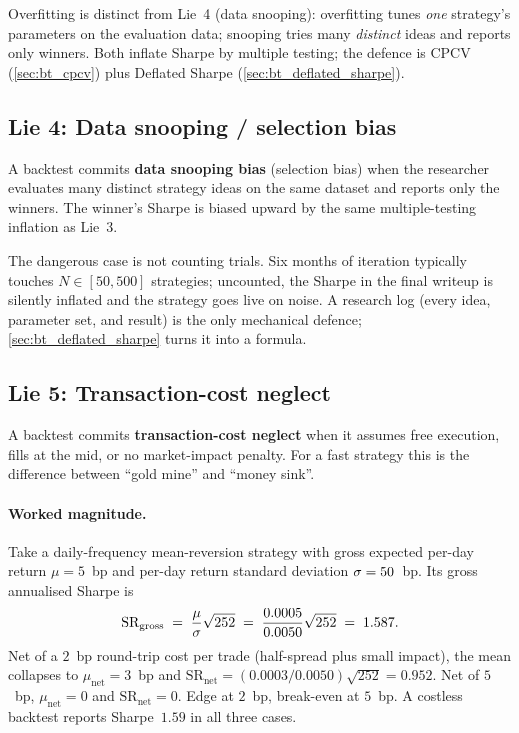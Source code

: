 Overfitting is distinct from Lie~4 (data snooping): overfitting tunes
\emph{one} strategy's parameters on the evaluation data; snooping
tries many \emph{distinct} ideas and reports only winners. Both
inflate Sharpe by multiple testing; the defence is CPCV
(\cref{sec:bt_cpcv}) plus Deflated Sharpe
(\cref{sec:bt_deflated_sharpe}).

\subsection{Lie 4: Data snooping / selection bias}
\label{subsec:lie_snooping}

A backtest commits \textbf{data snooping bias} (selection bias) when
the researcher evaluates many distinct strategy ideas on the same
dataset and reports only the winners. The winner's Sharpe is biased
upward by the same multiple-testing inflation as Lie~3.

The dangerous case is not counting trials. Six months of iteration
typically touches $N \in [50, 500]$ strategies; uncounted, the
Sharpe in the final writeup is silently inflated and the strategy
goes live on noise. A research log (every idea, parameter set, and
result) is the only mechanical defence;
\cref{sec:bt_deflated_sharpe} turns it into a formula.

\subsection{Lie 5: Transaction-cost neglect}
\label{subsec:lie_txcost}

A backtest commits \textbf{transaction-cost neglect} when it assumes
free execution, fills at the mid, or no market-impact penalty. For a
fast strategy this is the difference between ``gold mine'' and
``money sink''.

\paragraph{Worked magnitude.} Take a daily-frequency mean-reversion
strategy with gross expected per-day return $\mu = 5$~bp and
per-day return standard deviation $\sigma = 50$~bp. Its gross
annualised Sharpe is
\[
\text{SR}_{\text{gross}}
  \;=\; \frac{\mu}{\sigma}\sqrt{252}
  \;=\; \frac{0.0005}{0.0050}\sqrt{252}
  \;=\; 1.587.
\]
Net of a $2$~bp round-trip cost per trade (half-spread plus small
impact), the mean collapses to $\mu_{\text{net}} = 3$~bp and
$\text{SR}_{\text{net}} = (0.0003/0.0050)\sqrt{252} = 0.952$. Net of
$5$~bp, $\mu_{\text{net}} = 0$ and $\text{SR}_{\text{net}} = 0$.
Edge at $2$~bp, break-even at $5$~bp. A costless backtest reports
Sharpe~$1.59$ in all three cases.

